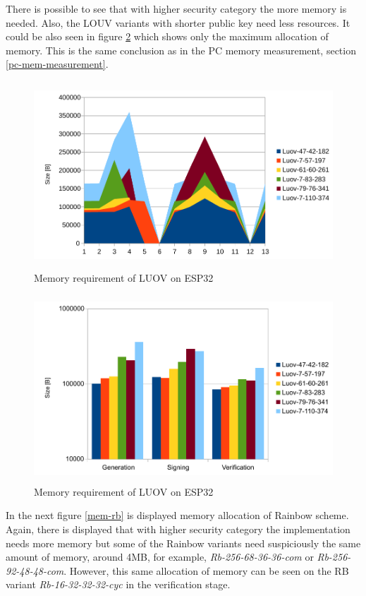 \documentclass[thesis=M,english]{FITthesis}[2019/12/23]
\begin{document}
\bigskip
\noindent
There is possible to see that with higher security category the more memory is needed. Also, the LOUV variants with shorter public key need less resources. It could be also seen in figure \ref{mem-luov} which shows only the maximum allocation of memory. This is the same conclusion as in the PC memory measurement, section \ref{pc-mem-measurement}.

\newpage
\bigskip\bigskip
\begin{figure}[H]
\centering
\includegraphics[width=13cm,height=7cm]{images/mem-luov0.pdf}
\caption{Memory requirement of LUOV on ESP32}
\label{mem-luov0}
\end{figure}

\bigskip\bigskip\bigskip
\begin{figure}[H]
\centering
\includegraphics[width=13cm,height=7cm]{images/mem-luov.pdf}
\caption{Memory requirement of LUOV on ESP32}
\label{mem-luov}
\end{figure}

\newpage
\noindent
In the next figure \ref{mem-rb} is displayed memory allocation of Rainbow scheme. Again, there is displayed that with higher security category the implementation needs more memory but some of the Rainbow variants need suspiciously the same amount of memory, around 4MB, for example, \textit{Rb-256-68-36-36-com} or \textit{Rb-256-92-48-48-com}. However, this same allocation of memory can be seen on the RB variant \textit{Rb-16-32-32-32-cyc} in the verification stage.
\end{document}
